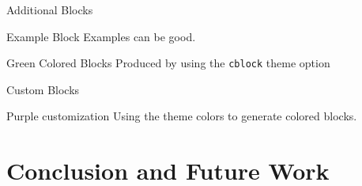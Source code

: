 \documentclass[newPxFont,numfooter,sectionpages]{beamer}
\begin{document}
    
    \begin{frame}{Additional Blocks}
    
    \begin{exampleblock}{Example Block}
        Examples can be good.
    \end{exampleblock}
    
    \begingroup
    \begin{block}{Green Colored Blocks}
        Produced by using the \texttt{cblock} theme option
    \end{block}
    \endgroup
    
    \end{frame}
    
    
    \begin{frame}{Custom Blocks}
    \begingroup
    \begin{block}{Purple customization}
        Using the theme colors to generate colored blocks.
    \end{block}
    \endgroup
    
    \end{frame}
    
    \section{Conclusion and Future Work}
    
    
\end{document}
